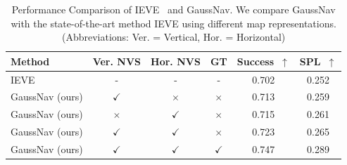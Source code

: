 \begin{table}[tb]
    \centering
    \vspace{5pt}
    \begin{tabular}{l c c c c c}
        \toprule
         Method & Ver. NVS & Hor. NVS & GT & Success~$\uparrow$ & SPL~$\uparrow$  \\
         \midrule
         IEVE~\cite{lei2024instanceaware} & - & - & - & 0.702 & 0.252 \\
         GaussNav (ours) & $\checkmark$ & $\times$ & $\times$ & 0.713 & 0.259 \\
         GaussNav (ours) & $\times$ & $\checkmark$ & $\times$ & 0.715 & 0.261 \\
         GaussNav (ours) & $\checkmark$ & $\checkmark$ & $\times$ & 0.723 & 0.265 \\
         GaussNav (ours) & $\checkmark$ & $\checkmark$ & $\checkmark$ & 0.747 & 0.289 \\
         \bottomrule
    \end{tabular}
    \vspace{-1pt}
    \caption{Performance Comparison of IEVE~\cite{lei2024instanceaware} and GaussNav. We compare GaussNav with the state-of-the-art method IEVE using different map representations. (Abbreviations: Ver. = Vertical, Hor. = Horizontal)}
    \vspace{-30pt}
    \label{tab:pre-exploration}
\end{table}